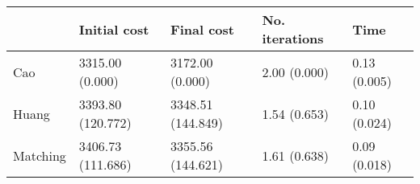 \begin{tabular}{lllll}
\toprule
{} &       Initial cost &         Final cost & No. iterations &          Time \\
\midrule
Cao      &    3315.00 (0.000) &    3172.00 (0.000) &   2.00 (0.000) &  0.13 (0.005) \\
Huang    &  3393.80 (120.772) &  3348.51 (144.849) &   1.54 (0.653) &  0.10 (0.024) \\
Matching &  3406.73 (111.686) &  3355.56 (144.621) &   1.61 (0.638) &  0.09 (0.018) \\
\bottomrule
\end{tabular}
